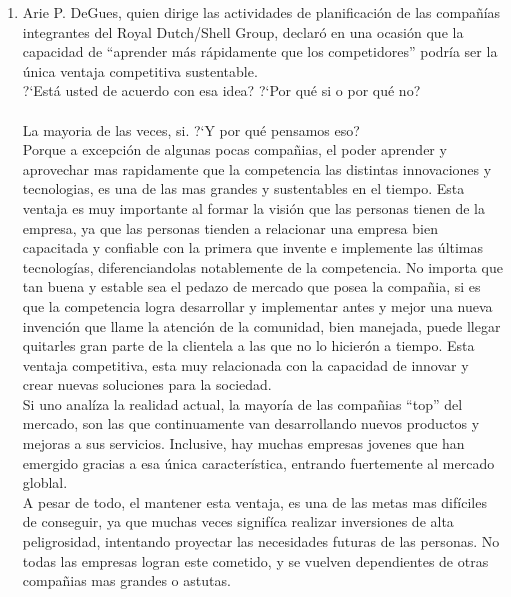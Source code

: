 \begin{itemize}
\begin{enumerate}
		\item Arie P. DeGues, quien dirige las actividades de planificaci\'on de las compa\~n\'ias integrantes del Royal Dutch/Shell Group, declar\'o en una ocasi\'on que la capacidad de ``aprender m\'as r\'apidamente que los competidores'' podr\'ia ser la \'unica ventaja competitiva sustentable.\\
		 ?`Est\'a usted de acuerdo con esa idea? ?`Por qu\'e si o por qu\'e no?\\\\
	La mayoria de las veces, si. ?`Y por qu\'e pensamos eso?\\ Porque a excepci\'on de algunas pocas compa\~nias, el poder aprender y aprovechar mas rapidamente que la competencia las distintas innovaciones y tecnologias, es una de las mas grandes y sustentables en el tiempo. Esta ventaja es muy importante al formar la visi\'on que las personas tienen de la empresa, ya que las personas tienden a relacionar una empresa bien capacitada y confiable con la primera que invente e implemente las \'ultimas tecnolog\'ias, diferenciandolas notablemente de la competencia. No importa que tan buena y estable sea el pedazo de mercado que posea la compa\~nia, si es que la competencia logra desarrollar y implementar antes y mejor una nueva invenci\'on que llame la atenci\'on de la comunidad, bien manejada, puede llegar quitarles gran parte de la clientela a las que no lo hicier\'on a tiempo. Esta ventaja competitiva, esta muy relacionada con la capacidad de innovar y crear nuevas soluciones para la sociedad.\\
	Si uno anal\'iza la realidad actual, la mayor\'ia de las compa\~nias ``top'' del mercado, son las que continuamente van desarrollando nuevos productos y mejoras a sus servicios. Inclusive, hay muchas empresas jovenes que han emergido gracias a esa \'unica caracter\'istica, entrando fuertemente al mercado globlal.\\
	A pesar de todo, el mantener esta ventaja, es una de las metas mas dif\'iciles de conseguir, ya que muchas veces signif\'ica realizar inversiones de alta peligrosidad, intentando proyectar las necesidades futuras de las personas. No todas las empresas logran este cometido, y se vuelven dependientes de otras compa\~nias mas grandes o astutas.


\end{enumerate}
\end{itemize}
